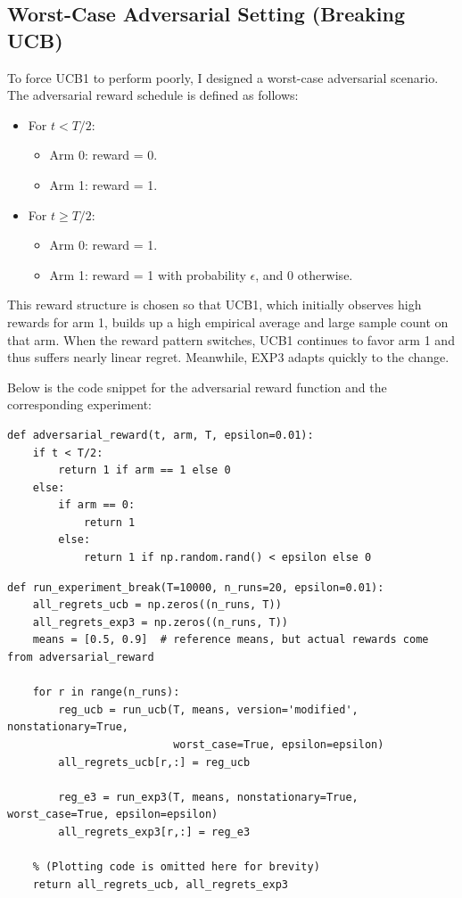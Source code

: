 \subsection*{Worst-Case Adversarial Setting (Breaking UCB)}

To force UCB1 to perform poorly, I designed a worst-case adversarial scenario. The adversarial reward schedule is defined as follows:
\begin{itemize}
    \item For $t < T/2$:
    \begin{itemize}
       \item Arm 0: reward = 0.
       \item Arm 1: reward = 1.
    \end{itemize}
    \item For $t \ge T/2$:
    \begin{itemize}
       \item Arm 0: reward = 1.
       \item Arm 1: reward = 1 with probability $\epsilon$, and 0 otherwise.
    \end{itemize}
\end{itemize}
This reward structure is chosen so that UCB1, which initially observes high rewards for arm 1, builds up a high empirical average and large sample count on that arm. When the reward pattern switches, UCB1 continues to favor arm 1 and thus suffers nearly linear regret. Meanwhile, EXP3 adapts quickly to the change.

Below is the code snippet for the adversarial reward function and the corresponding experiment:

\begin{lstlisting}
def adversarial_reward(t, arm, T, epsilon=0.01):
    if t < T/2:
        return 1 if arm == 1 else 0
    else:
        if arm == 0:
            return 1
        else:
            return 1 if np.random.rand() < epsilon else 0
\end{lstlisting}

\begin{lstlisting}
def run_experiment_break(T=10000, n_runs=20, epsilon=0.01):
    all_regrets_ucb = np.zeros((n_runs, T))
    all_regrets_exp3 = np.zeros((n_runs, T))
    means = [0.5, 0.9]  # reference means, but actual rewards come from adversarial_reward
    
    for r in range(n_runs):
        reg_ucb = run_ucb(T, means, version='modified', nonstationary=True,
                          worst_case=True, epsilon=epsilon)
        all_regrets_ucb[r,:] = reg_ucb
        
        reg_e3 = run_exp3(T, means, nonstationary=True, worst_case=True, epsilon=epsilon)
        all_regrets_exp3[r,:] = reg_e3

    % (Plotting code is omitted here for brevity)
    return all_regrets_ucb, all_regrets_exp3
\end{lstlisting}

